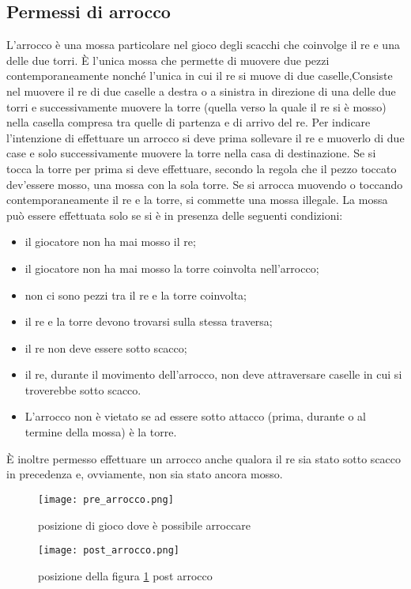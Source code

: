 \subsection{Permessi di arrocco}
\label{arrocco}
L'arrocco è  una mossa particolare nel gioco degli scacchi che coinvolge il re e una delle due
torri. È l'unica mossa che permette di muovere due pezzi contemporaneamente nonché l'unica
in cui il re si muove di due caselle,Consiste nel muovere il re di due caselle a destra o a sinistra in direzione di una delle due torri e successivamente muovere la torre
(quella verso la quale il re si è mosso) nella casella compresa tra quelle di partenza e di arrivo del re.
Per indicare l'intenzione di effettuare un arrocco si deve prima sollevare il re e muoverlo di due case e solo successivamente muovere la torre nella casa di destinazione. Se si tocca la torre per prima si
deve effettuare, secondo la regola che il pezzo toccato dev'essere mosso, una mossa con la sola torre. Se si arrocca muovendo o toccando contemporaneamente il re e la torre, si commette una mossa illegale.
La mossa può essere effettuata solo se si è in presenza delle seguenti condizioni:
\begin{itemize}
    \item   il giocatore non ha mai mosso il re;
    \item il giocatore non ha mai mosso la torre coinvolta nell'arrocco;
    \item   non ci sono pezzi tra il re e la torre coinvolta;
    \item il re e la torre devono trovarsi sulla stessa traversa;
    \item  il re non deve essere sotto scacco;
    \item   il re, durante il movimento dell'arrocco, non deve attraversare caselle in cui si troverebbe sotto scacco.
    \item  L'arrocco non è vietato se ad essere sotto attacco (prima, durante o al termine della mossa) è la torre.
\end{itemize}
È inoltre permesso effettuare un arrocco anche qualora il re sia stato sotto scacco in precedenza e, ovviamente, non sia stato ancora mosso.

\begin{figure}[!tbp]
    \centering
    \begin{minipage}[b]{0.4\textwidth}
        \texttt{[image: pre\_arrocco.png]}
        \caption{posizione di gioco dove è possibile arroccare}
        \label{prearrocco}
    \end{minipage}
    \hfill
    \begin{minipage}[b]{0.4\textwidth}
        \texttt{[image: post\_arrocco.png]}
        \caption{posizione della figura \ref{prearrocco} post arrocco}
    \end{minipage}
\end{figure}

